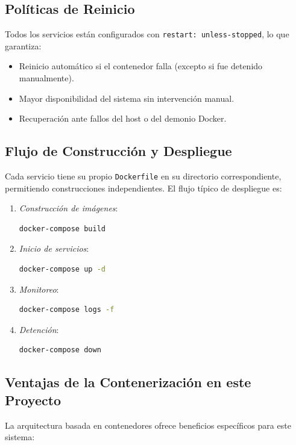 \documentclass{article}
\begin{document}
\subsection{Políticas de Reinicio}
Todos los servicios están configurados con \texttt{restart: unless-stopped}, lo que garantiza:
\begin{itemize}
    \item Reinicio automático si el contenedor falla (excepto si fue detenido manualmente).
    \item Mayor disponibilidad del sistema sin intervención manual.
    \item Recuperación ante fallos del host o del demonio Docker.
\end{itemize}

\subsection{Flujo de Construcción y Despliegue}
Cada servicio tiene su propio \texttt{Dockerfile} en su directorio correspondiente, permitiendo construcciones independientes. El flujo típico de despliegue es:

\begin{enumerate}
    \item \textit{Construcción de imágenes}:
    \begin{lstlisting}[language=bash, basicstyle=\small\ttfamily]
    docker-compose build
    \end{lstlisting}

    \item \textit{Inicio de servicios}:
    \begin{lstlisting}[language=bash, basicstyle=\small\ttfamily]
    docker-compose up -d
    \end{lstlisting}

    \item \textit{Monitoreo}:
    \begin{lstlisting}[language=bash, basicstyle=\small\ttfamily]
    docker-compose logs -f
    \end{lstlisting}

    \item \textit{Detención}:
    \begin{lstlisting}[language=bash, basicstyle=\small\ttfamily]
    docker-compose down
    \end{lstlisting}
\end{enumerate}

\subsection{Ventajas de la Contenerización en este Proyecto}
La arquitectura basada en contenedores ofrece beneficios específicos para este sistema:
\end{document}
